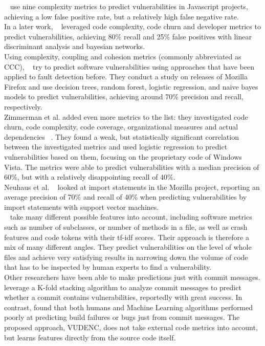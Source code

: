 \documentclass[
	a4paper,
	pagesize,
	pdftex,
	12pt,
	twoside, %
	BCOR=5mm, %
	ngerman,
	fleqn,
	final,
	]{scrartcl}
\begin{document}
~\cite{Shin.2008} use nine complexity metrics to predict vulnerabilities in Javascript projects, achieving a low false positive rate, but a relatively high false negative rate.\\
In a later work, ~\cite{Shin.2010} leveraged code complexity, code churn and developer metrics to predict vulnerabilities, achieving 80\% recall and 25\% false positives with linear discriminant analysis and bayesian networks. \\
Using complexity, coupling and cohesion metrics (commonly abbreviated as CCC), ~\cite{Chowdhury.2011} try to predict software vulnerabilities using approaches that have been applied to fault detection before. They conduct a study on releases of Mozilla Firefox and use decision trees, random forest, logistic regression, and naive bayes models to predict vulnerabilities, achieving around 70\% precision and recall, respectively. \\
Zimmerman et al. added even more metrics to the list: they investigated code churn, code complexity, code coverage, organizational measures and actual dependencies ~\cite{Zimmermann.2010}. They found a weak, but statistically significant correlation between the investigated metrics and used logistic regression to predict vulnerabilities based on them, focusing on the proprietary code of Windows Vista. The metrics were able to predict vulnerabilities with a median precision of 60\%, but with a relatively disappointing recall of 40\%. \\
Neuhaus et al. ~\cite{Neuhaus.2007} looked at import statements in the Mozilla project, reporting an average precision of 70\% and recall of 40\% when predicting vulnerabilities by import statements with support vector machines. \\
~\cite{Yu.2019} take many different possible features into account, including software metrics such as number of subclasses, or number of methods in a file, as well as crash features and code tokens with their tf-idf scores. Their approach is therefore a mix of many different angles. They predict vulnerabilities on the level of whole files and achieve very satisfying results in narrowing down the volume of code that has to be inspected by human experts to find a vulnerability.\\
Other researchers have been able to make predictions just with commit messages. \cite{Zhou.2017} leverage a K-fold stacking algorithm to analyze commit messages to predict whether a commit contains vulnerabilities, reportedly with great success. In contrast, \cite{Russell.2018} found that both humans and Machine Learning algorithms performed poorly at predicting build failures or bugs just from commit messages.
The proposed approach, VUDENC, does not take external code metrics into account, but learns features directly from the source code itself. 
\end{document}
